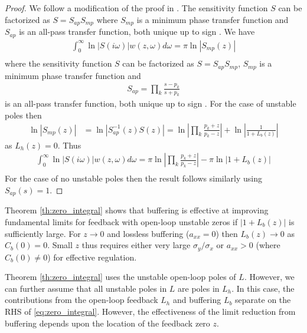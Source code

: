 \documentclass[letterpaper, 10 pt,  conference]{ieeeconf}  %
\begin{document}
\begin{proof}
We follow a modification of the proof in \cite{DOYFT90}. The sensitivity function $S$ can be factorized as $S=S_{ap}S_{mp}$ where $S_{mp}$ is a minimum phase transfer function and $S_{ap}$ is an all-pass transfer function, both unique up to sign \cite{DOYFT90}. We have \cite{DOYFT90}
\begin{equation*}
\begin{aligned}
\int_0^\infty \ln|S(i\omega)|w(z,\omega)d\omega =\pi\ln|S_{mp}(z)| \\
\end{aligned}
\end{equation*}
where the sensitivity function $S$ can be factorized as $S=S_{ap}S_{mp}$, $S_{mp}$ is a minimum phase transfer function and
\begin{equation*}
\begin{aligned}
S_{ap}=\prod_k\frac{s-p_k}{s+p_k}
\end{aligned}
\end{equation*}
is an all-pass transfer function, both unique up to sign \cite{DOYFT90}. For the case of unstable poles then
\begin{equation*}
\begin{aligned}
\ln|S_{mp}(z)|&=\ln|S_{ap}^{-1}(z)S(z)| =\ln\left|\prod_k \frac{p_k+z}{p_k-z}\right|+\ln\left|\frac{1}{1+L_b(z)}\right|
\end{aligned}
\end{equation*}
as $L_h(z)=0$. Thus
\begin{equation*}
\begin{aligned}
\int_0^\infty \ln|S(i\omega)|w(z,\omega)d\omega =\pi\ln\left|\prod_k \frac{p_k+z}{p_k-z}\right|-\pi\ln\left|1+L_b(z)\right| \\
\end{aligned}
\end{equation*}
For the case of no unstable poles then the result follows similarly using $S_{ap}(s)=1$.
\end{proof}
Theorem \ref{th:zero_integral} shows that buffering is effective at improving fundamental limits for feedback with open-loop unstable zeros if $\left|1+L_b(z)\right|$ is sufficiently large. For $z\to0$ and lossless buffering ($a_{xx}=0$) then $L_b(z)\to 0$ as $C_b(0)= 0$. Small $z$ thus requires either very large $\sigma_y/\sigma_x$ or $a_{xx}>0$ (where $C_b(0)\ne 0$) for effective regulation.

Theorem \ref{th:zero_integral} uses the unstable open-loop poles of $L$. However, we can further assume that all unstable poles in $L$ are poles in $L_h$. In this case, the contributions from the open-loop feedback $L_h$ and buffering $L_b$ separate on the RHS of \eqref{eq:zero_integral}. However, the effectiveness of the limit reduction from buffering depends upon the location of the feedback zero $z$.
\end{document}
